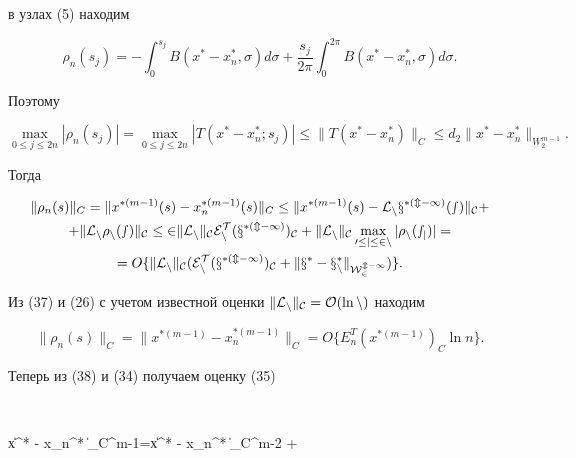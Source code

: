 в узлах (5) находим


$$


\rho_n(s_j)=- \int_0^{s_j} B(x^* - x_n^*, \sigma) d \sigma + \frac{s_j}{2 \pi}


\int_0^{2 \pi} B(x^* - x_n^*, \sigma) d \sigma.


$$


Поэтому


$$


\max_{0 \leq j \leq 2n} | \rho_n(s_j) |=\max_{0 \leq j \leq 2n}


| T(x^* - x_n^*;s_j) | \leq \| T(x^* - x_n^*) \|_{C}


\leq d_2 \| x^* - x_n^* \|_{W_2^{m-1}}.


$$


Тогда


\begin{multline}


\| \rho_n(s) \|_{C}=\| x^{*(m-1)}(s) - x_n^{*(m-1)}(s) \|_{C}


\leq \| x^{*(m-1)}(s) - \rL_n x^{*(m-1)}(s) \|_{C} + \\


%


+ \| \rL_n \rho_n(s) \|_{C} \leq 2 \| \rL_n \|_{C} 


E_n^T(x^{*(m-1)})_{C} + \| \rL_n \|_{C} \max_{0 \leq j \leq 2n}


| \rho_n(s_j) |=\\


%


=O \lbrace \| \rL_n \|_{C} (E_n^T(x^{*(m-1)})_{C}


+ \| x^* - x_n^* \|_{W_2^{m-1}}) \rbrace.


\end{multline}





Из (37) и (26) с учетом известной оценки $ \| \cal{L}_n \|_C=O( \ln n) $ находим


\begin{equation}


\| \rho_n(s) \|_{C}=\| x^{*(m-1)} - x_n^{*(m-1)} \|_{C}=


O \lbrace E_n^T(x^{*(m-1)})_{C} \ln n \rbrace.


\end{equation}


Теперь из (38) и (34) получаем оценку (35)


$$


\| x^* - x_n^* \|_{C^{m-1}}=\| x^* - x_n^* \|_{C^{m-2}} +


